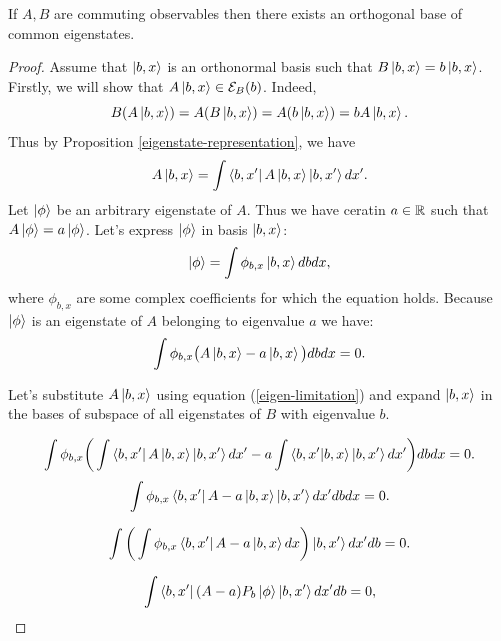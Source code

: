 \documentclass[main.tex]{subfiles}
\begin{document}
\begin{theorem}
If $A, B$ are commuting observables then there exists an orthogonal base of common eigenstates.
\end{theorem}
\begin{proof}
Assume that $\ket{b,x}$ is an orthonormal basis such that $B \ket{b,x} = b \ket{b,x}$.
Firstly, we will show that $A \ket{b,x} \in \mathcal{E}_B(b)$. Indeed,
\begin{equation}
B(A \ket{b,x}) = A(B \ket{b,x}) = A(b \ket{b,x}) = b A\ket{b,x}.
\end{equation}
Thus by Proposition \ref{eigenstate-representation}, we have 
\begin{equation}
\label{eigen-limitation}
A \ket{b,x} = \int \bra{b, x'} A \ket{b, x} \ket{b, x'} d x'.
\end{equation}
Let $\ket{\phi}$ be an arbitrary eigenstate of $A$. Thus we have ceratin $a\in \mathbb{R}$ such that 
$A \ket{\phi} = a \ket{\phi}$. Let's express $\ket{\phi}$ in basis $\ket{b,x}$:
\begin{equation}
\ket{\phi} = \int \phi_{b, x} \ket{b,x} db dx,
\end{equation}
where $\phi_{b, x}$ are some complex coefficients for which the equation holds.
Because $\ket{\phi}$ is an eigenstate of $A$ belonging to eigenvalue $a$ we have:
\begin{equation}
\int \phi_{b, x} \big( A\ket{b, x} - a\ket{b, x}\big)dbdx = 0.
\end{equation}


Let's substitute $A\ket{b, x}$ using equation (\ref{eigen-limitation}) and expand $\ket{b, x}$ in the bases of subspace of all eigenstates of $B$ with eigenvalue $b$.

\begin{equation}
\int \phi_{b, x} \bigg( \int \bra{b, x'} A \ket{b, x}  \ket{b, x'} d x' - a\int \bra{b, x'}\ket{b, x}  \ket{b, x'} d x'\bigg)dbdx = 0.
\end{equation}
\begin{equation}
\int \phi_{b, x} \bra{b, x'} A - a \ket{b, x}  \ket{b, x'}  d x'dbdx = 0.
\end{equation}

\begin{equation}
\int \bigg(\int \phi_{b, x} \bra{b, x'} A - a \ket{b, x}dx\bigg)  \ket{b, x'} d x' db = 0.
\end{equation}

\begin{equation}
\int \bra{b, x'} (A - a)P_b \ket{\phi} \ket{b, x'} d x' db = 0,
\end{equation}


\end{proof}
\end{document}
